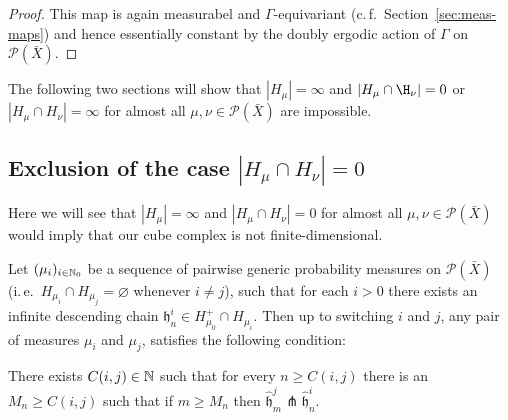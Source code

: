 \begin{proof}
  This map is again measurabel and \(\Gamma\)-equivariant (c.\,f.~Section~\ref{sec:meas-maps}) and hence essentially constant by the doubly ergodic action of \(\Gamma\) on \(\mathcal{P}(\bar X)\).
\end{proof}

The following two sections will show that \(|H_\mu| = \infty\) and \(|H_\mu \cap \H_\nu| = 0\) or \(|H_\mu \cap H_\nu| = \infty\) for almost all \(\mu, \nu \in \mathcal{P}(\bar X)\) are impossible. 

\subsection{Exclusion of the case \(|H_\mu \cap H_\nu| = 0\)}
\label{sec:M=0}

Here we will see that \(|H_\mu| = \infty\) and \(|H_\mu \cap H_\nu| = 0\) for almost all \(\mu, \nu \in \mathcal{P}(\bar X)\) would imply that our cube complex is not finite-dimensional.

\begin{lemma}[{\cite[Lemma~4.13]{MR3509968}}]
  \label{lem:4.13}
  Let \((\mu_i)_{i \in \mathbb{N}_0}\) be a sequence of pairwise generic probability measures on \(\mathcal{P}(\bar X)\) (i.\,e.\ \(H_{\mu_i} \cap H_{\mu_j} = \varnothing\) whenever \(i \neq j\)), such that for each \(i > 0\) there exists an infinite descending chain \(\mathfrak{h}_n^i \in H_{\mu_0}^+ \cap H_{\mu_i}\). Then up to switching \(i\) and \(j\), any pair of measures \(\mu_i\) and \(\mu_j\), satisfies the following condition:

  There exists \(C(i,j) \in \mathbb{N}\) such that for every \(n \geq C(i,j)\) there is an \(M_n \geq C(i,j)\) such that if \(m \geq M_n\) then \(\mathfrak{\hat h}^j_m \pitchfork \mathfrak{\hat h}^i_n\). 
\end{lemma}


